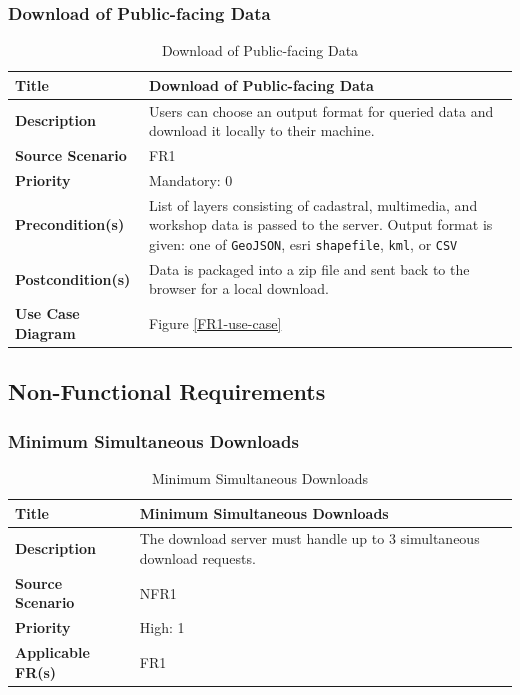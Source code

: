 \documentclass{article}
\begin{document}
\subsubsection{Download of Public-facing Data}

\begin{table}[H]
	\caption{Download of Public-facing Data}
	\begin{tabularx}{\textwidth}{|l|X|}
		\hline
		\textbf{Title}            & Download of Public-facing Data            \\ \hline
		\textbf{Description}      & Users can choose an output format for
		queried data and download it locally to their machine. \\ \hline
		\textbf{Source Scenario}  & FR1                                       \\ \hline
		\textbf{Priority}         & Mandatory: 0                              \\ \hline
		\textbf{Precondition(s)}  & List of layers consisting of cadastral,
		multimedia, and workshop data is passed to the server. Output format
		is given: one of \texttt{GeoJSON}, esri \texttt{shapefile}, \texttt{kml},
		or \texttt{CSV} \\ \hline
		\textbf{Postcondition(s)} & Data is packaged into a zip file and sent
		back to the browser for a local download. \\ \hline
		\textbf{Use Case Diagram} & Figure \ref{FR1-use-case}                 \\  \hline
	\end{tabularx}
\end{table}

\subsection{Non-Functional Requirements}

\subsubsection{Minimum Simultaneous Downloads}

\begin{table}[H]
	\caption{Minimum Simultaneous Downloads}
	\begin{tabularx}{\textwidth}{|l|X|}
		\hline
		\textbf{Title}            & Minimum Simultaneous Downloads          \\ \hline
		\textbf{Description}      & The download server must handle up to 3
		simultaneous download requests. \\ \hline
		\textbf{Source Scenario}  & NFR1                                    \\ \hline
		\textbf{Priority}         & High: 1                                 \\ \hline
		\textbf{Applicable FR(s)} & FR1                                     \\ \hline
	\end{tabularx}
\end{table}
\end{document}
